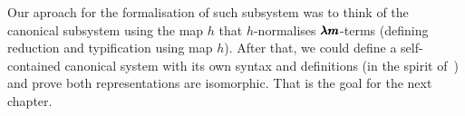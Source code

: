 Our aproach for the formalisation of such subsystem was to think of the canonical subsystem using the map $h$ that $h$-normalises $\pmb{\lambda m}$-terms (defining reduction and typification using map $h$).
After that, we could define a self-contained canonical system with its own syntax and definitions (in the spirit of~\cite[Chapter~3.1]{JCES2002}) and prove both representations are isomorphic.
That is the goal for the next chapter.

